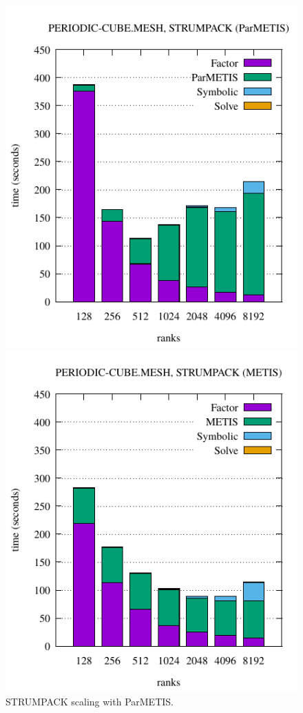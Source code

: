 \vspace{-.3in}
\begin{figure}[htb]
\begin{minipage}[b]{0.48\columnwidth}
\centering
\includegraphics[scale=0.7]{projects/2.3.3-MathLibs/2.3.3.07-STRUMPACK-SuperLU/periodic-cube-scaling-strumpack.pdf}
\caption{STRUMPACK scaling with ParMETIS.}
\label{fig:strumpack-parmetis-scaling}
\end{minipage}
\begin{minipage}[b]{0.48\columnwidth}
\centering
\includegraphics[scale=0.7]{projects/2.3.3-MathLibs/2.3.3.07-STRUMPACK-SuperLU/periodic-cube-scaling-strumpack_metis.pdf}

\end{minipage}
\end{figure}
